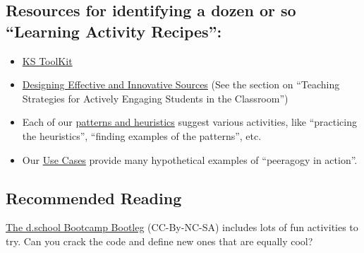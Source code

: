 \subsection{Resources for identifying a dozen or so ``Learning Activity
Recipes'':}

\begin{itemize}
\item
  \href{http://www.kstoolkit.org/KS+Methods}{KS ToolKit}
\item
  \href{http://serc.carleton.edu/NAGTWorkshops/coursedesign/tutorial/strategies.html}{Designing
  Effective and Innovative Sources} (See the section on ``Teaching
  Strategies for Actively Engaging Students in the Classroom'')
\item
  Each of our
  \href{http://peeragogy.org/patterns-and-heuristics/}{patterns and
  heuristics} suggest various activities, like ``practicing the
  heuristics'', ``finding examples of the patterns'', etc.
\item
  Our \href{http://peeragogy.org/use-cases}{Use Cases} provide many
  hypothetical examples of ``peeragogy in action''.
\end{itemize}
\subsection{Recommended Reading}

\href{http://dschool.stanford.edu/wp-content/uploads/2011/03/BootcampBootleg2010v2SLIM.pdf}{The
d.school Bootcamp Bootleg} (CC-By-NC-SA) includes lots of fun activities
to try. Can you crack the code and define new ones that are equally
cool?
